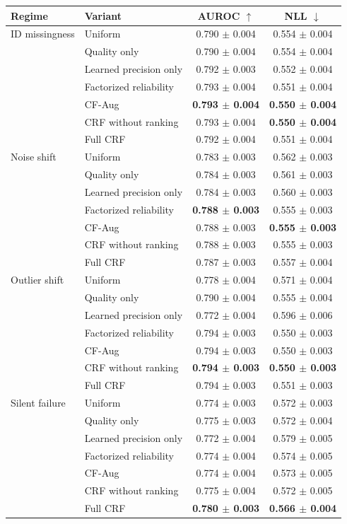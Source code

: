 \begin{tabular}{llcc}
\toprule
Regime & Variant & AUROC $\uparrow$ & NLL $\downarrow$ \\
\midrule
ID missingness & Uniform & 0.790 $\pm$ 0.004 & 0.554 $\pm$ 0.004 \\
 & Quality only & 0.790 $\pm$ 0.004 & 0.554 $\pm$ 0.004 \\
 & Learned precision only & 0.792 $\pm$ 0.003 & 0.552 $\pm$ 0.004 \\
 & Factorized reliability & 0.793 $\pm$ 0.004 & 0.551 $\pm$ 0.004 \\
 & CF-Aug & \textbf{0.793 $\pm$ 0.004} & \textbf{0.550 $\pm$ 0.004} \\
 & CRF without ranking & 0.793 $\pm$ 0.004 & \textbf{0.550 $\pm$ 0.004} \\
 & Full CRF & 0.792 $\pm$ 0.004 & 0.551 $\pm$ 0.004 \\
\addlinespace
Noise shift & Uniform & 0.783 $\pm$ 0.003 & 0.562 $\pm$ 0.003 \\
 & Quality only & 0.784 $\pm$ 0.003 & 0.561 $\pm$ 0.003 \\
 & Learned precision only & 0.784 $\pm$ 0.003 & 0.560 $\pm$ 0.003 \\
 & Factorized reliability & \textbf{0.788 $\pm$ 0.003} & 0.555 $\pm$ 0.003 \\
 & CF-Aug & 0.788 $\pm$ 0.003 & \textbf{0.555 $\pm$ 0.003} \\
 & CRF without ranking & 0.788 $\pm$ 0.003 & 0.555 $\pm$ 0.003 \\
 & Full CRF & 0.787 $\pm$ 0.003 & 0.557 $\pm$ 0.004 \\
\addlinespace
Outlier shift & Uniform & 0.778 $\pm$ 0.004 & 0.571 $\pm$ 0.004 \\
 & Quality only & 0.790 $\pm$ 0.004 & 0.555 $\pm$ 0.004 \\
 & Learned precision only & 0.772 $\pm$ 0.004 & 0.596 $\pm$ 0.006 \\
 & Factorized reliability & 0.794 $\pm$ 0.003 & 0.550 $\pm$ 0.003 \\
 & CF-Aug & 0.794 $\pm$ 0.003 & 0.550 $\pm$ 0.003 \\
 & CRF without ranking & \textbf{0.794 $\pm$ 0.003} & \textbf{0.550 $\pm$ 0.003} \\
 & Full CRF & 0.794 $\pm$ 0.003 & 0.551 $\pm$ 0.003 \\
\addlinespace
Silent failure & Uniform & 0.774 $\pm$ 0.003 & 0.572 $\pm$ 0.003 \\
 & Quality only & 0.775 $\pm$ 0.003 & 0.572 $\pm$ 0.004 \\
 & Learned precision only & 0.772 $\pm$ 0.004 & 0.579 $\pm$ 0.005 \\
 & Factorized reliability & 0.774 $\pm$ 0.004 & 0.574 $\pm$ 0.005 \\
 & CF-Aug & 0.774 $\pm$ 0.004 & 0.573 $\pm$ 0.005 \\
 & CRF without ranking & 0.775 $\pm$ 0.004 & 0.572 $\pm$ 0.005 \\
 & Full CRF & \textbf{0.780 $\pm$ 0.003} & \textbf{0.566 $\pm$ 0.004} \\
\bottomrule
\end{tabular}